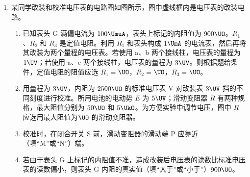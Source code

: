 \documentclass[\gkver]{gaokaozhenti}
\begin{document}
\begin{enumerate}
{（2）由 $a=\frac{\Delta v}{\Delta t}$ 可得 $a=\frac{0.96-0.56}{2\times5\times0.02}\Umsq=2.0\Umsq$。
}

\item
某同学改装和校准电压表的电路图如图所示，图中虚线框内是电压表的改装电路。
\begin{enumerate}
	\item
	已知表头 G 满偏电流为 $100\UmuA$，表头上标记的内阻值为 $900\UO$。$R_{1}$、$R_{2}$ 和 $R_{3}$ 是定值电阻。利用 $R_{1}$ 和表头构成 $1\UmA$ 的电流表，然后再将其改装为两个量程的电压表。若使用 a、b 两个接线柱，电压表的量程为 $1\UV$；若使用 a、c 两个接线柱，电压表的量程为 $3\UV$。则根据题给条件，定值电阻的阻值应选 $R_{1}=$$\UO$，$R_{2}=$$\UO$，$R_{3}=$$\UO$。
	\item
	用量程为 $3\UV$，内阻为 $2500\UO$ 的标准电压表 V 对改装表 $3\UV$ 挡的不同刻度进行校准。所用电池的电动势 $E$ 为 $5\UV$；滑动变阻器 $R$ 有两种规格，最大阻值分别为 $50\UO$ 和 $5\UkO$。为方便实验中调节电压，图中 $R$ 应选用最大阻值为$\UO$ 的滑动变阻器。
	\item
	校准时，在闭合开关 S 前，滑动变阻器的滑动端 P 应靠近（填“M”或“N”）端。
	\item
	若由于表头 G 上标记的内阻值不准，造成改装后电压表的读数比标准电压表的读数偏小，则表头 G 内阻的真实值（填“大于”或“小于”）$900\UO$。
\end{enumerate}
\end{enumerate}
\end{document}
